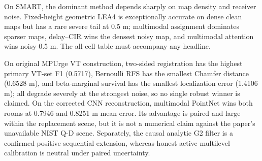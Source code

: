 \documentclass[10pt]{article}
\begin{document}
On SMART, the dominant method depends sharply on map density and receiver
noise.  Fixed-height geometric LEA4 is exceptionally accurate on dense clean
maps but has a rare severe tail at 0.5 m; multimodal assignment dominates
sparser maps, delay--CIR wins the densest noisy map, and multimodal attention
wins noisy 0.5 m.  The all-cell table must accompany any headline.

On original MPUrge VT construction, two-sided registration has the highest
primary VT-set F1 (0.5717), Bernoulli RFS has the smallest Chamfer distance
(0.6528 m), and beta-marginal survival has the smallest localization error
(1.4106 m); all degrade severely at the strongest noise, so no single robust
winner is claimed.  On the corrected CNN reconstruction, multimodal PointNet
wins both rooms at 0.7946 and 0.8251 m mean error.  Its advantage is paired and
large within the replacement scene, but it is not a numerical claim against the
paper's unavailable NIST Q-D scene.  Separately, the causal analytic G2 filter
is a confirmed positive sequential extension, whereas honest active multilevel
calibration is neutral under paired uncertainty.
\end{document}
